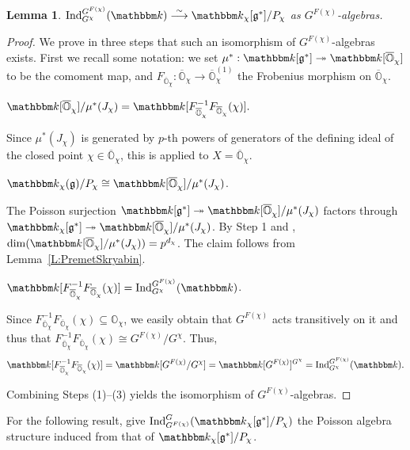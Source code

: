 \documentclass[twoside,12pt,reqno]{amsart}
\newtheorem{Lemma}[Theorem]{Lemma}
\theoremstyle{remark}
\numberwithin{equation}{section}
\def\iso{\cong}
\def\isoto{\overset{\sim}{\longrightarrow}}
\def\k{{\mathbbm k}}
\def\Ind{\operatorname{Ind}}
\def\o{\overline}
\def\O{{\mathbb O}}
\def\cO{{\overline{\mathbb O}}}
\def\g{{\mathfrak g}}
\begin{document}
\begin{Lemma}
\label{L:inducedsimplePoissonquotient}
    $\Ind_{G^\chi}^{G^{F(\chi)}}(\k) \isoto \k_\chi[\g^*]/P_\chi$ as $G^{F(\chi)}$-algebras.
\end{Lemma}
    \begin{proof}
    
    
    We prove in three steps that such an isomorphism of $G^{F(\chi)}$-algebras exists. First we recall some notation: we set $\mu^*:\k[\g^*]\twoheadrightarrow\k[\o\O_\chi]$ to be the comoment map, and $F_{\o\O_\chi}:\o\O_\chi\to\o\O_\chi^{(1)}$ the Frobenius morphism on $\o\O_\chi$.

     $\k[\o\O_\chi]/\mu^*(J_\chi)=\k[F_{\o\O_\chi}^{-1}F_{\o\O_\chi}(\chi)].$

    Since $\mu^*(J_\chi)$ is generated by $p$-th powers of generators of the defining ideal of the closed point $\chi\in\o\O_\chi$, this is \cite[I.9.3]{JanRAGS} applied to $X=\cO_\chi$.

     $\k_\chi(\g)/P_\chi\iso \k[\o\O_\chi]/\mu^*(J_\chi)$.

   
   The Poisson surjection $\k[\g^*]\twoheadrightarrow \k[\cO_\chi]/\mu^*(J_\chi)$ factors through $\k_\chi[\g^*]\twoheadrightarrow \k[\cO_\chi]/\mu^*(J_\chi)$. By Step 1 and \cite[I.9.3(3)]{JanRAGS}, $\dim(\k[\cO_\chi]/\mu^*(J_\chi))=p^{d_\chi}$. The claim follows from Lemma~\ref{L:PremetSkryabin}.

     $\k[F_{\o\O_\chi}^{-1}F_{\o\O_\chi}(\chi)]=\Ind_{G^\chi}^{G^{F(\chi)}}(\k)$.
   
   Since $F_{\o\O_\chi}^{-1}F_{\o\O_\chi}(\chi)\subseteq \O_\chi$, we easily obtain that $G^{F(\chi)}$ acts transitively on it and thus that $F_{\o\O_\chi}^{-1}F_{\o\O_\chi}(\chi)\iso G^{F(\chi)}/G^\chi$. Thus, $$\k[F_{\o\O_\chi}^{-1}F_{\o\O_\chi}(\chi)]=\k[G^{F(\chi)}/G^\chi]=\k[G^{F(\chi)}]^{G^\chi}=\Ind_{G^\chi}^{G^{F(\chi)}}(\k).$$

   Combining Steps (1)--(3) yields the isomorphism of $G^{F(\chi)}$-algebras. 

\end{proof}
For the following result, give $\Ind_{G^{F(\chi)}}^G (\k_\chi[\g^*] / P_\chi)$ the Poisson algebra structure induced from that of $\k_\chi[\g^*] / P_\chi$.
\end{document}

